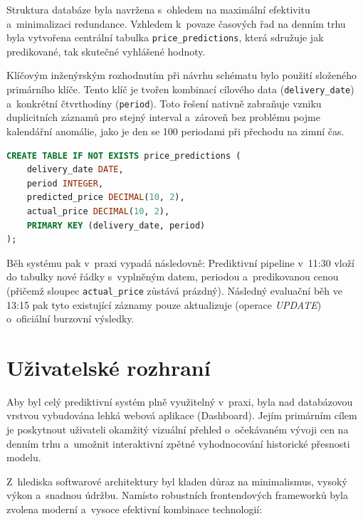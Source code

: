 \documentclass[a4paper]{article}
\begin{document}
Struktura databáze byla navržena s~ohledem na maximální efektivitu a~minimalizaci redundance. Vzhledem k~povaze časových řad na denním trhu byla vytvořena centrální tabulka \texttt{price\_predictions}, která sdružuje jak predikované, tak skutečné vyhlášené hodnoty.

Klíčovým inženýrským rozhodnutím při návrhu schématu bylo použití složeného primárního klíče. Tento klíč je tvořen kombinací cílového data (\texttt{delivery\_date}) a~konkrétní čtvrthodiny (\texttt{period}). Toto řešení nativně zabraňuje vzniku duplicitních záznamů pro stejný interval a~zároveň bez problému pojme kalendářní anomálie, jako je den se 100 periodami při přechodu na zimní čas.

\begin{lstlisting}[language=SQL, caption={SQL schéma pro ukládání predikcí a~reálných cen se složeným primárním klíčem}]
CREATE TABLE IF NOT EXISTS price_predictions (
    delivery_date DATE,
    period INTEGER,               
    predicted_price DECIMAL(10, 2),
    actual_price DECIMAL(10, 2),   
    PRIMARY KEY (delivery_date, period) 
);
\end{lstlisting}
Běh systému pak v~praxi vypadá následovně: Prediktivní pipeline v~11:30 vloží do tabulky nové řádky s~vyplněným datem, periodou a~predikovanou cenou (přičemž sloupec \texttt{actual\_price} zůstává prázdný). Následný evaluační běh ve 13:15 pak tyto existující záznamy pouze aktualizuje (operace \textit{UPDATE}) o~oficiální burzovní výsledky.

\newpage
\section{Uživatelské rozhraní}
Aby byl celý prediktivní systém plně využitelný v~praxi, byla nad databázovou vrstvou vybudována lehká webová aplikace (Dashboard). Jejím primárním cílem je poskytnout uživateli okamžitý vizuální přehled o~očekávaném vývoji cen na denním trhu a~umožnit interaktivní zpětné vyhodnocování historické přesnosti modelu.

Z~hlediska softwarové architektury byl kladen důraz na minimalismus, vysoký výkon a~snadnou údržbu. Namísto robustních frontendových frameworků byla zvolena moderní a~vysoce efektivní kombinace technologií:
\end{document}
